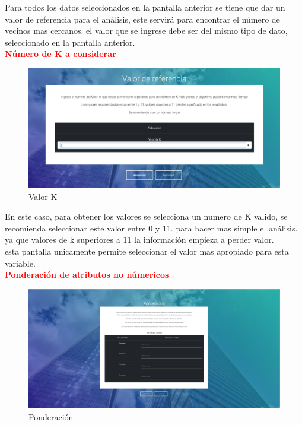 Para todos los datos seleccionados en la pantalla anterior se tiene que dar un valor de referencia para el análisis, este servirá para encontrar el número de vecinos mas cercanos. el valor que se ingrese debe ser del mismo tipo de dato, seleccionado en la pantalla anterior.\\ 
\textbf{\textcolor{red}{Número de K a considerar}}
\begin{figure}[H]
	\hypertarget{fig:red}{\hspace{1pt}}
	\begin{center}
		\includegraphics[width=1\textwidth]{capitulo7/images/valorK.png}
		\caption{Valor K}
		\label{fig:ref}
	\end{center}
\end{figure}  
En este caso, para obtener los valores se selecciona un numero de K valido, se recomienda seleccionar este valor entre 0 y 11. para hacer mas simple el análisis. ya que valores de k superiores a 11 la información empieza a perder valor.\\
esta pantalla unicamente permite seleccionar el valor mas apropiado para esta variable.\\
\textbf{\textcolor{red}{Ponderación de atributos no númericos}}
\\
\begin{figure}[H]
	\hypertarget{fig:red}{\hspace{1pt}}
	\begin{center}
		\includegraphics[width=1\textwidth]{capitulo7/images/ponderacion.png}
		\caption{Ponderación}
		\label{fig:pond}
	\end{center}
\end{figure}  
